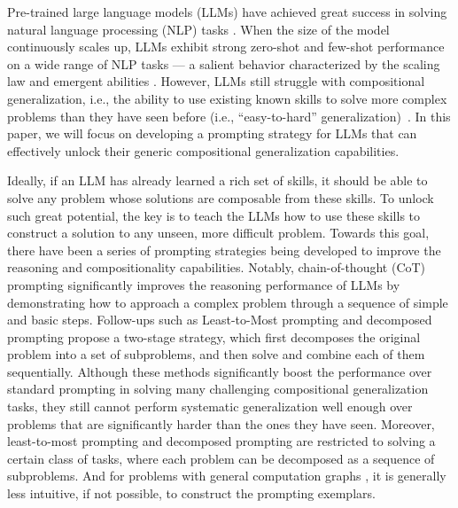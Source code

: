 \documentclass{article} \usepackage{arxiv}
\begin{document}
Pre-trained large language models (LLMs) have achieved great success in solving natural language processing (NLP) tasks \citep{brown2020language, Radford2019LanguageMA, smith2022using, chowdhery2022palm, lewkowycz2022solving, sanh2021multitask, wei2021finetuned, mishra2022cross, chung2022scaling, ouyang2022training,openai2023gpt4,touvron2023llama}. When the size of the model continuously scales up, LLMs exhibit strong zero-shot and few-shot performance on a wide range of NLP tasks \citep{brown2020language,wei2021finetuned,chowdhery2022palm,zhou2022least,cot_wei_sc,li2022advance,wang2022rationale,kojima2022large,shi2022language,magister2022teaching,ho2022large,nye2021show,dua2022successive,openai2023gpt4} --- a salient behavior characterized by the scaling law \citep{kaplan2020scaling,hoffmann2022training} and emergent abilities \citep{wei2022emergent}. However, LLMs still struggle with compositional generalization, i.e., the ability to use existing known skills to solve more complex problems than they have seen before (i.e., ``easy-to-hard'' generalization)~\citep{zhou2022least,dziri2023faith}. In this paper, we will focus on developing a prompting strategy for LLMs that can effectively unlock their generic compositional generalization capabilities.



Ideally, if an LLM has already learned a rich set of skills, it should be able to solve any problem whose solutions are composable from these skills. To unlock such great potential, the key is to teach the LLMs how to use these skills to construct a solution to any unseen, more difficult problem. Towards this goal, there have been a series of prompting strategies being developed to improve the reasoning and compositionality capabilities. Notably, chain-of-thought (CoT) prompting \citep{wei2022chain} significantly improves the reasoning performance of LLMs by demonstrating how to approach a complex problem through a sequence of simple and basic steps. Follow-ups such as Least-to-Most prompting \citep{zhou2022least} and decomposed prompting \citep{khot2022decomposed} propose a two-stage strategy, which first decomposes the original problem into a set of subproblems, and then solve and combine each of them sequentially. Although these methods significantly boost the performance over standard prompting in solving many challenging compositional generalization tasks, they still cannot perform systematic generalization well enough over problems that are significantly harder than the ones they have seen. Moreover, least-to-most prompting and decomposed prompting are restricted to solving a certain class of tasks, where each problem can be decomposed as a sequence of subproblems. And for problems with general computation graphs \citep{dziri2023faith}, it is generally less intuitive, if not possible, to construct the prompting exemplars.
\end{document}
